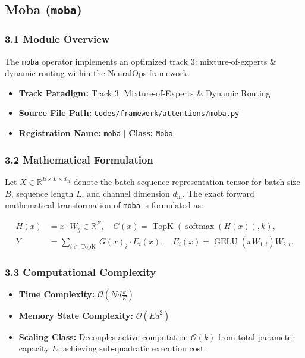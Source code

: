 \subsection{Moba (\texttt{moba})}
\label{sec:app_module_moba}

\subsubsection*{3.1 Module Overview}
The \texttt{moba} operator implements an optimized track 3: mixture-of-experts \& dynamic routing within the NeuralOps framework.
\begin{itemize}
    \item \textbf{Track Paradigm:} Track 3: Mixture-of-Experts \& Dynamic Routing
    \item \textbf{Source File Path:} \texttt{Codes/framework/attentions/moba.py}
    \item \textbf{Registration Name:} \texttt{moba} $\mid$ \textbf{Class:} \texttt{Moba}
\end{itemize}

\subsubsection*{3.2 Mathematical Formulation}
Let $X \in \mathbb{R}^{B \times L \times d_{\text{in}}}$ denote the batch sequence representation tensor for batch size $B$, sequence length $L$, and channel dimension $d_{\text{in}}$. The exact forward mathematical transformation of \texttt{moba} is formulated as:

\begin{align}
H(x) &= x \cdot W_g \in \mathbb{R}^{E}, \quad G(x) = \operatorname{TopK}\left(\operatorname{softmax}(H(x)), k\right), \\
Y &= \sum_{i \in \operatorname{TopK}} G(x)_i \cdot E_i(x), \quad E_i(x) = \operatorname{GELU}(x W_{1, i}) W_{2, i}.
\end{align}


\subsubsection*{3.3 Computational Complexity}
\begin{itemize}
    \item \textbf{Time Complexity:} $\mathcal{O}(N d \frac{k}{E})$
    \item \textbf{Memory State Complexity:} $\mathcal{O}(E d^2)$
    \item \textbf{Scaling Class:} Decouples active computation $\mathcal{O}(k)$ from total parameter capacity $E$, achieving sub-quadratic execution cost.
\end{itemize}

